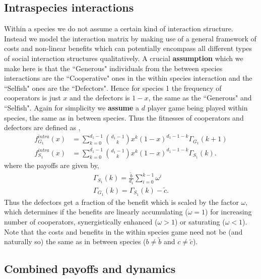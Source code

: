 \documentclass[times,onecolumn]{scrartcl}
\begin{document}
\subsection{Intraspecies interactions}
\label{appB}

Within a species we do not assume a certain kind of interaction structure.
Instead we model the interaction matrix by making use of a general framework of costs and non-linear benefits \cite{eshel:AmNat:1988,hauert:JTB:2006a} which can potentially encompass all different types of social interaction structures qualitatively.
A crucial \textbf{assumption} which we make here is that the ``Generous" individuals from the between species interactions are the ``Cooperative" ones in the within species interaction and the ``Selfish" ones are the ``Defectors".
Hence for species 1 the frequency of cooperators is just $x$ and the defectors is $1-x$, the same as the ``Generous" and ``Selfish".
Again for simplicity we \textbf{assume} a $d$ player game being played within species, the same as in between species.
Thus the fitnesses of cooperators and defectors are defined as \cite{hauert:JTB:2006a},
%
\begin{align}
	f^{intra}_{G_1} (x) &= \sum_{k=0}^{d_1 -1} \binom{d_1 -1}{k}x^k (1-x)^{d_1 -1-k} \Gamma_{G_1}(k+1) \\
	f^{intra}_{S_1} (x) &= \sum_{k=0}^{d_1 -1} \binom{d_1 -1}{k}x^k (1-x)^{d_1 -1-k} \Gamma_{S_1}(k).
\label{intrafiteqs}
\end{align}
%
where the payoffs are given by,
\begin{align}
	\Gamma_{S_1} (k) = \frac{\tilde{b}}{d_1} \sum_{i=0}^{k-1} \omega^i \\
	\Gamma_{G_1} (k) = \Gamma_{S_1} (k) - \tilde{c}.
\label{eqintragamepayoffs}
\end{align}
%
Thus the defectors get a fraction of the benefit which is scaled by the factor $\omega$, which determines if the benefits are linearly accumulating ($\omega=1$) for increasing number of cooperators, synergistically enhanced ($\omega>1$) or saturating ($\omega<1$).
Note that the costs and benefits in the within species game need not be (and naturally so) the same as in between species ($b\neq \tilde{b}$ and $c \neq \tilde{c}$).


\subsection{Combined payoffs and dynamics}
\end{document}
